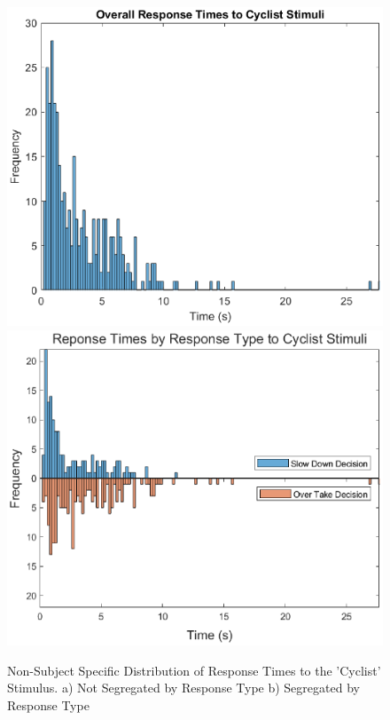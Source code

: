 \begin{figure}[H]
    \centering
    \includegraphics[width=0.37\paperwidth]{figures/BikeReactionTimes.eps}
    \includegraphics[width=0.37\paperwidth]{figures/BikeReactionTimes2.eps}
    \caption{Non-Subject Specific Distribution of Response Times to the 'Cyclist' Stimulus. a) Not Segregated by Response Type b) Segregated by Response Type}
    \label{fig:RT_B}
\end{figure}
